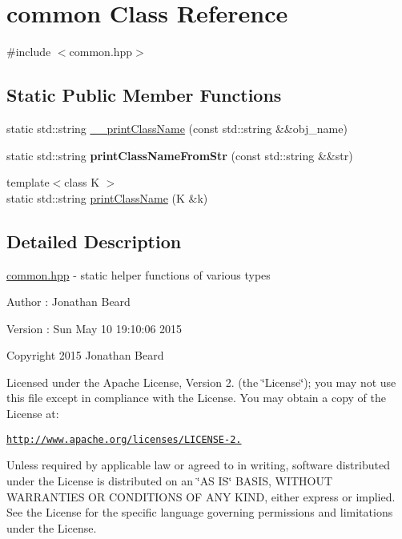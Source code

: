 \hypertarget{classcommon}{}\section{common Class Reference}
\label{classcommon}


{\ttfamily \#include $<$common.\+hpp$>$}

\subsection*{Static Public Member Functions}
\begin{DoxyCompactItemize}
\item 
static std\+::string \hyperlink{classcommon_a7ca2338596041e14a38de0f63d1c1e31}{\+\_\+\+\_\+print\+Class\+Name} (const std\+::string \&\&obj\+\_\+name)
\item 
\hypertarget{classcommon_aa84197a1f03508da476a68d11fe139d5}{}static std\+::string {\bfseries print\+Class\+Name\+From\+Str} (const std\+::string \&\&str)\label{classcommon_aa84197a1f03508da476a68d11fe139d5}

\item 
{\footnotesize template$<$class K $>$ }\\static std\+::string \hyperlink{classcommon_aec4b942352abd180c71fca2c0dbd70b7}{print\+Class\+Name} (K \&k)
\end{DoxyCompactItemize}


\subsection{Detailed Description}
\hyperlink{common_8hpp_source}{common.\+hpp} -\/ static helper functions of various types \begin{DoxyAuthor}{Author}
\+: Jonathan Beard 
\end{DoxyAuthor}
\begin{DoxyVersion}{Version}
\+: Sun May 10 19\+:10\+:06 2015
\end{DoxyVersion}
Copyright 2015 Jonathan Beard

Licensed under the Apache License, Version 2. (the \char`\"{}\+License\char`\"{}); you may not use this file except in compliance with the License. You may obtain a copy of the License at\+:

\href{http://www.apache.org/licenses/LICENSE-2.0}{\tt http\+://www.\+apache.\+org/licenses/\+L\+I\+C\+E\+N\+S\+E-\/2.}

Unless required by applicable law or agreed to in writing, software distributed under the License is distributed on an \char`\"{}\+A\+S I\+S\char`\"{} B\+A\+S\+I\+S, W\+I\+T\+H\+O\+U\+T W\+A\+R\+R\+A\+N\+T\+I\+E\+S O\+R C\+O\+N\+D\+I\+T\+I\+O\+N\+S O\+F A\+N\+Y K\+I\+N\+D, either express or implied. See the License for the specific language governing permissions and limitations under the License. 


